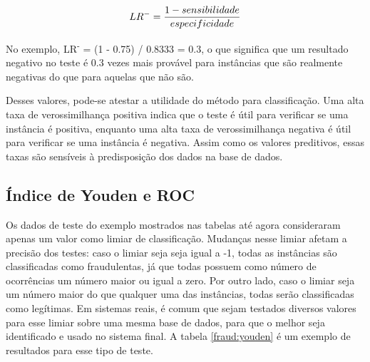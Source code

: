 \begin{equation}
    \vspace{2mm}
    LR^{-}=\frac{1 - sensibilidade}{especificidade}
    \vspace{2mm}
\end{equation}

No exemplo, LR\textsuperscript{-} = (1 - 0.75) / 0.8333 = 0.3, o que significa que um resultado negativo no teste é 0.3 vezes mais provável para instâncias que são realmente negativas do que para aquelas que não são.

Desses valores, pode-se atestar a utilidade do método para classificação. Uma alta taxa de verossimilhança positiva indica que o teste é útil para verificar se uma instância é positiva, enquanto uma alta taxa de verossimilhança negativa é útil para verificar se uma instância é negativa. Assim como os valores preditivos, essas taxas são sensíveis à predisposição dos dados na base de dados.

\subsection{Índice de Youden e ROC}

Os dados de teste do exemplo mostrados nas tabelas até agora consideraram apenas um valor como limiar de classificação. Mudanças nesse limiar afetam a precisão dos testes: caso o limiar seja seja igual a -1, todas as instâncias são classificadas como fraudulentas, já que todas possuem como número de ocorrências um número maior ou igual a zero. Por outro lado, caso o limiar seja um número maior do que qualquer uma das instâncias, todas serão classificadas como legítimas. Em sistemas reais, é comum que sejam testados diversos valores para esse limiar sobre uma mesma base de dados, para que o melhor seja identificado e usado no sistema final. A tabela \ref{fraud:youden} é um exemplo de resultados para esse tipo de teste.

